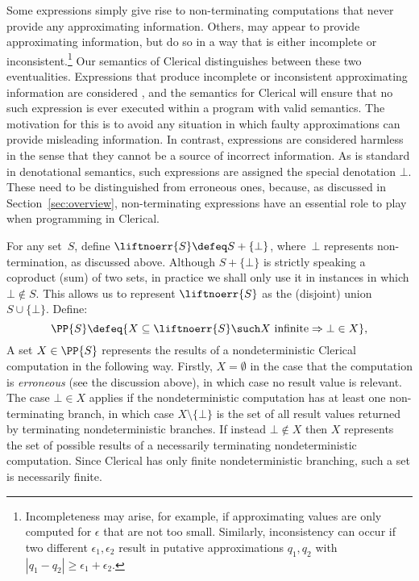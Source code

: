 Some expressions simply give rise to non-terminating computations that never provide any approximating information. Others, may appear to provide approximating information, but do so in a way that is either incomplete or inconsistent.\footnote{Incompleteness may  arise, for example, if approximating values are only computed for $\epsilon$ that are not too small. Similarly, inconsistency can occur if two different $\epsilon_1, \epsilon_2$ result in putative approximations $q_1,q_2$ with $|q_1 - q_2| \geq \epsilon_1 + \epsilon_2$.} Our semantics of Clerical distinguishes between these two eventualities. Expressions that produce incomplete or inconsistent approximating information are considered , and the semantics for Clerical will ensure that no such expression is ever executed within a program with valid semantics. The motivation for this is to avoid any situation in which faulty approximations can provide misleading information. In contrast,  expressions are considered harmless in the sense that they cannot be a source of incorrect information. As is standard in denotational semantics, such expressions are assigned the special denotation $\bot$. 
These need to be distinguished from erroneous ones, because, as discussed in Section~\ref{sec:overview},  non-terminating expressions 
have an essential role to play  when programming in Clerical.


For any set~$S$,  define $\liftnoerr{S} \defeq S + \{\bot\}$, where~$\bot$ represents non-termination, as discussed above. 
Although $S + \{\bot\}$ is strictly speaking a coproduct (sum) of two sets, in practice we shall only use it
in instances in which $\bot \notin S$. This allows us to represent $\liftnoerr{S}$ as the (disjoint) union 
$S \cup \{\bot\}$.
Define:
\begin{equation*}
  \PP{S} \defeq
  \{ X \subseteq \liftnoerr{S} \such
       \text{$X$ infinite} \Rightarrow \bot \in X
  \},
\end{equation*}
%
A set $X \in  \PP{S}$ represents the results of a nondeterministic Clerical computation in the following way. Firstly, $X = \emptyset$ in the case that the computation is \emph{erroneous} (see the discussion above), in which case no result value is relevant. 
%
The case $\bot \in X$ applies if the nondeterministic computation has at least one non-terminating branch, in which case $X \setminus \{\bot\}$ is the set of all result values returned by terminating nondeterministic branches. If instead $\bot \notin X$ then $X$ represents the set of possible results of a necessarily terminating nondeterministic computation. Since Clerical has only  finite nondeterministic branching, such a set is necessarily finite.

